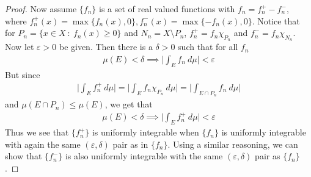 \documentclass[12pt]{exam}
\theoremstyle{plain} %
\theoremstyle{definition} %
\theoremstyle{remark} %
\begin{document}
\begin{questions}
\begin{solution}
\begin{proof}
      Now assume $\{ f_n \}$ is a  set of real valued functions with
      $f_n = f_n^+ - f_n^-$, where
      $f_n^+(x) = \max \{ f_n(x), 0 \}, f_n^-( x) = \max \{ -f_n(x), 0
      \}$. Notice that for $P_n = \{ x \in X \ : \ f_n(x) \ge 0 \}$ and
      $N_n = X \setminus P_n$, $f_n^+ = f_n \chi_{P_n}$ and $f_n^- =
      f_n \chi_{N_n}$. Now let $\varepsilon > 0$ be given. Then there
      is a $\delta > 0$ such that for all $f_n$
      \begin{align*}
        \mu(E) < \delta \implies \Bigg| \int_E f_n \ d \mu \Bigg| < \varepsilon
      \end{align*}
      But since
      \begin{align*}
        \Bigg| \int_E f_n^+ \ d \mu \Bigg| = \Bigg| \int_E f_n
        \chi_{P_n} \ d \mu \Bigg| = \Bigg| \int_{E \cap P_n} f_n \ d \mu \Bigg|
      \end{align*}
      and $\mu(E \cap P_n) \le \mu(E)$, we get that
      \begin{align*}
        \mu(E) < \delta \implies \Bigg| \int_E f_n^+ \ d \mu \Bigg| <
        \varepsilon
      \end{align*}
      Thus we see that $\{ f_n^+ \}$ is uniformly integrable when $\{
      f_n \}$ is uniformly integrable with again the same
      $(\varepsilon, \delta)$ pair as in $\{ f_n \}$. Using a similar
      reasoning, we can show that $\{ f_n^- \}$ is also uniformly
      integrable with the same $(\varepsilon, \delta)$ pair as $\{ f_n \}$.


\end{proof}
\end{solution}
\end{questions}
\end{document}

